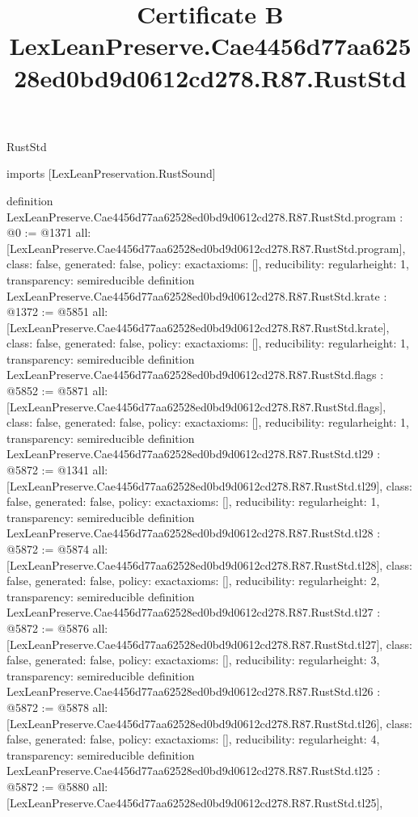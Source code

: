 \begin{lexlean}{RustStd}
\title{Certificate B LexLeanPreserve.Cae4456d77aa62528ed0bd9d0612cd278.R87.RustStd}
\begin{coremodule}
imports [LexLeanPreservation.RustSound]

definition LexLeanPreserve.Cae4456d77aa62528ed0bd9d0612cd278.R87.RustStd.program : @0 := @1371 {
  all: [LexLeanPreserve.Cae4456d77aa62528ed0bd9d0612cd278.R87.RustStd.program],
  class: false,
  generated: false,
  policy: exact{axioms: []},
  reducibility: regular{height: 1},
  transparency: semireducible
}
definition LexLeanPreserve.Cae4456d77aa62528ed0bd9d0612cd278.R87.RustStd.krate : @1372 := @5851 {
  all: [LexLeanPreserve.Cae4456d77aa62528ed0bd9d0612cd278.R87.RustStd.krate],
  class: false,
  generated: false,
  policy: exact{axioms: []},
  reducibility: regular{height: 1},
  transparency: semireducible
}
definition LexLeanPreserve.Cae4456d77aa62528ed0bd9d0612cd278.R87.RustStd.flags : @5852 := @5871 {
  all: [LexLeanPreserve.Cae4456d77aa62528ed0bd9d0612cd278.R87.RustStd.flags],
  class: false,
  generated: false,
  policy: exact{axioms: []},
  reducibility: regular{height: 1},
  transparency: semireducible
}
definition LexLeanPreserve.Cae4456d77aa62528ed0bd9d0612cd278.R87.RustStd.tl29 : @5872 := @1341 {
  all: [LexLeanPreserve.Cae4456d77aa62528ed0bd9d0612cd278.R87.RustStd.tl29],
  class: false,
  generated: false,
  policy: exact{axioms: []},
  reducibility: regular{height: 1},
  transparency: semireducible
}
definition LexLeanPreserve.Cae4456d77aa62528ed0bd9d0612cd278.R87.RustStd.tl28 : @5872 := @5874 {
  all: [LexLeanPreserve.Cae4456d77aa62528ed0bd9d0612cd278.R87.RustStd.tl28],
  class: false,
  generated: false,
  policy: exact{axioms: []},
  reducibility: regular{height: 2},
  transparency: semireducible
}
definition LexLeanPreserve.Cae4456d77aa62528ed0bd9d0612cd278.R87.RustStd.tl27 : @5872 := @5876 {
  all: [LexLeanPreserve.Cae4456d77aa62528ed0bd9d0612cd278.R87.RustStd.tl27],
  class: false,
  generated: false,
  policy: exact{axioms: []},
  reducibility: regular{height: 3},
  transparency: semireducible
}
definition LexLeanPreserve.Cae4456d77aa62528ed0bd9d0612cd278.R87.RustStd.tl26 : @5872 := @5878 {
  all: [LexLeanPreserve.Cae4456d77aa62528ed0bd9d0612cd278.R87.RustStd.tl26],
  class: false,
  generated: false,
  policy: exact{axioms: []},
  reducibility: regular{height: 4},
  transparency: semireducible
}
definition LexLeanPreserve.Cae4456d77aa62528ed0bd9d0612cd278.R87.RustStd.tl25 : @5872 := @5880 {
  all: [LexLeanPreserve.Cae4456d77aa62528ed0bd9d0612cd278.R87.RustStd.tl25],
}
\end{coremodule}
\end{lexlean}
